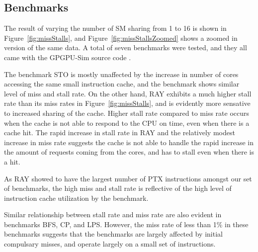 

\subsection{Benchmarks}
\label{sec:benchmarks}
The result of varying the number of SM sharing from 1 to 16 is shown in Figure~\ref{fig:missStalls}, and Figure~\ref{fig:missStallsZoomed} shows 
a zoomed in version of the same data. A total of seven benchmarks were
tested, and they all came with the GPGPU-Sim source code \cite{bakhodayuan09}.

The benchmark STO is mostly unaffected by the increase in number of cores
accessing the same small instruction cache, and the benchmark shows similar
level of miss and stall rate. 
On the other hand, RAY exhibits a much higher stall rate than its miss rates in Figure~\ref{fig:missStalls}, 
and is evidently more sensative to increased sharing of the cache.
Higher stall rate compared to miss rate occurs when the cache is not able to 
respond to the CPU on time, even when there is a cache hit.
The rapid increase in stall rate in RAY and the relatively modest increase in miss rate 
suggests the cache is not able to handle the rapid increase in the amount of requests coming from the cores,
and has to stall even when there is a hit.

As RAY showed to have the largest number of PTX instructions amongst our set of benchmarks,
the high miss and stall rate is reflective of the high level of instruction cache utilization
by the benchmark. 

Similar relationship between stall rate and miss rate are also evident in 
benchmarks BFS, CP, and LPS. However, the miss rate of less than 1\% in these benchmarks
suggests that the benchmarks are largely affected by initial compulsary misses, and operate
largely on a small set of instructions.

